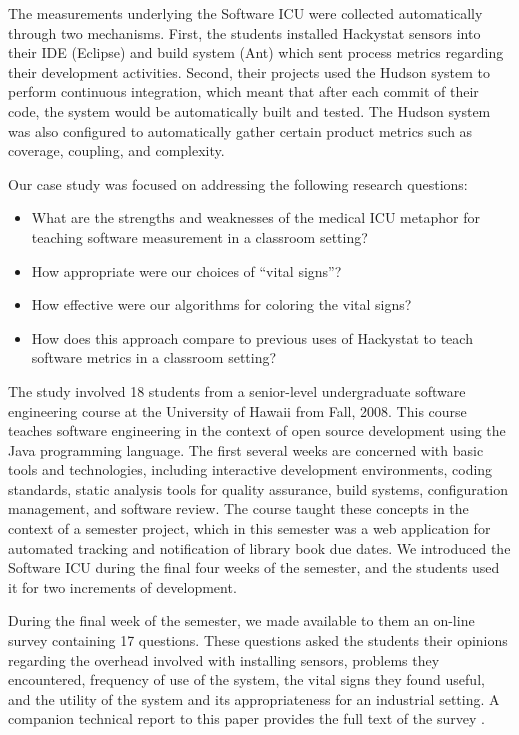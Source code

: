 \documentclass[10pt,twocolumn]{article}
\begin{document}
The measurements underlying the Software ICU were collected automatically
through two mechanisms. First, the students installed Hackystat sensors
into their IDE (Eclipse) and build system (Ant) which sent process
metrics regarding their development activities.  Second, their projects
used the Hudson system to perform continuous integration, which meant that
after each commit of their code, the system would be automatically built
and tested.  The Hudson system was also configured to automatically gather
certain product metrics such as coverage, coupling, and complexity.

\label{sec:evaluation}

Our case study was focused on addressing the following research questions: 
\begin{itemize}
\item What are the strengths and weaknesses of the medical ICU metaphor for 
teaching software measurement in a classroom setting? 
\item How appropriate were our choices of ``vital signs''?
\item How effective were our algorithms for coloring the vital signs? 
\item How does this approach compare to previous uses of Hackystat to teach software metrics
in a classroom setting? 
\end{itemize}

The study involved 18 students from a senior-level undergraduate software
engineering course at the University of Hawaii from Fall, 2008. This course
teaches software engineering in the context of open source development
using the Java programming language.  The first several weeks are concerned
with basic tools and technologies, including interactive development
environments, coding standards, static analysis tools for quality
assurance, build systems, configuration management, and software review.
The course taught these concepts in the context of a semester project,
which in this semester was a web application for automated tracking and
notification of library book due dates.  We introduced the Software ICU
during the final four weeks of the semester, and the students used it for
two increments of development.

During the final week of the semester, we made available to them an on-line
survey containing 17 questions.  These questions asked the students their
opinions regarding the overhead involved with installing sensors, problems
they encountered, frequency of use of the system, the vital signs they
found useful, and the utility of the system and its appropriateness for an
industrial setting.  A companion technical report to this paper provides
the full text of the survey \cite{csdl2-09-03}.
\end{document}
